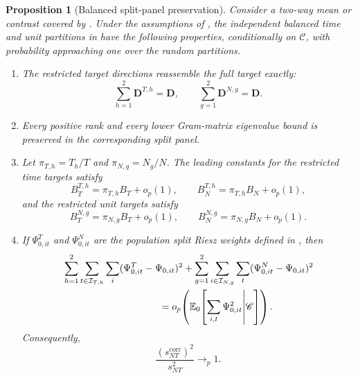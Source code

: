 \documentclass[11pt]{article}
\numberwithin{equation}{section}
\newtheorem{proposition}{Proposition}
\theoremstyle{remark}
\newcommand{\Ezero}{\mathbb E_0}
\newcommand{\bD}{\bm D}
\begin{document}
\begin{proposition}[Balanced split-panel preservation]
\label{prop:split_preservation}
Consider a two-way mean or contrast covered by . Under the assumptions of , the independent balanced time and unit partitions in  have the following properties, conditionally on $\mathscr C$, with probability approaching one over the random partitions.
\begin{enumerate}[label=(\roman*),leftmargin=2em]
\item The restricted target directions reassemble the full target exactly:
$$
\sum_{h=1}^{2}\bD^{T,h}=\bD,
\qquad
\sum_{g=1}^{2}\bD^{N,g}=\bD.
$$
\item Every positive rank and every lower Gram-matrix eigenvalue bound is preserved in the corresponding split panel.
\item Let $\pi_{T,h}=T_h/T$ and $\pi_{N,g}=N_g/N$. The leading constants for the restricted time targets satisfy
$$
B_T^{T,h}=\pi_{T,h}B_T+o_p(1),
\qquad
B_N^{T,h}=\pi_{T,h}B_N+o_p(1),
$$
and the restricted unit targets satisfy
$$
B_T^{N,g}=\pi_{N,g}B_T+o_p(1),
\qquad
B_N^{N,g}=\pi_{N,g}B_N+o_p(1).
$$
\item If $\Psi_{0,it}^{T}$ and $\Psi_{0,it}^{N}$ are the population split Riesz weights defined in , then
\begin{align}
&\sum_{h=1}^{2}\sum_{t\in\mathcal I_{T,h}}\sum_i
(\Psi_{0,it}^{T}-\Psi_{0,it})^2
+
\sum_{g=1}^{2}\sum_{i\in\mathcal I_{N,g}}\sum_t
(\Psi_{0,it}^{N}-\Psi_{0,it})^2
\nonumber\\
&\hspace{35mm}
=o_p\!\left(
\Ezero\!\left[\sum_{i,t}\Psi_{0,it}^2\middle|\mathscr C\right]
\right).
\label{eq:split_riesz_preservation}
\end{align}
Consequently,
\begin{equation}
\label{eq:corrected_variance_equivalence}
\frac{(s_{NT}^{\mathrm{corr}})^2}{s_{NT}^2}
\longrightarrow_p1.
\end{equation}
\end{enumerate}
\end{proposition}
\end{document}
